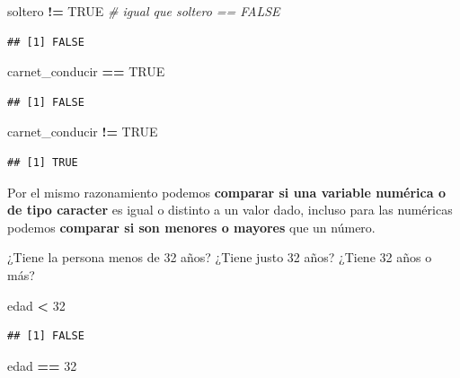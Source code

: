 \documentclass[11pt,]{book}
\newenvironment{Shaded}{\begin{snugshade}}{\end{snugshade}}
\newcommand{\CommentTok}[1]{\textcolor[rgb]{0.37,0.37,0.37}{\textit{#1}}}
\newcommand{\DecValTok}[1]{\textcolor[rgb]{0.06,0.06,0.06}{#1}}
\newcommand{\NormalTok}[1]{#1}
\newcommand{\OperatorTok}[1]{\textcolor[rgb]{0.43,0.43,0.43}{\textbf{#1}}}
\newcommand{\OtherTok}[1]{\textcolor[rgb]{0.37,0.37,0.37}{#1}}
\newcommand{\StringTok}[1]{\textcolor[rgb]{0.5,0.5,0.5}{#1}}
\begin{document}
\begin{Shaded}
\begin{Highlighting}[]
\NormalTok{soltero }\OperatorTok{!=}\StringTok{ }\OtherTok{TRUE} \CommentTok{# igual que soltero == FALSE}
\end{Highlighting}
\end{Shaded}

\begin{verbatim}
## [1] FALSE
\end{verbatim}

\begin{Shaded}
\begin{Highlighting}[]
\NormalTok{carnet_conducir }\OperatorTok{==}\StringTok{ }\OtherTok{TRUE}
\end{Highlighting}
\end{Shaded}

\begin{verbatim}
## [1] FALSE
\end{verbatim}

\begin{Shaded}
\begin{Highlighting}[]
\NormalTok{carnet_conducir }\OperatorTok{!=}\StringTok{ }\OtherTok{TRUE}
\end{Highlighting}
\end{Shaded}

\begin{verbatim}
## [1] TRUE
\end{verbatim}

Por el mismo razonamiento podemos \textbf{comparar si una variable numérica o de tipo caracter} es igual o distinto a un valor dado, incluso para las numéricas podemos \textbf{comparar si son menores o mayores} que un número.

¿Tiene la persona menos de 32 años? ¿Tiene justo 32 años? ¿Tiene 32 años o más?

\begin{Shaded}
\begin{Highlighting}[]
\NormalTok{edad }\OperatorTok{<}\StringTok{ }\DecValTok{32}
\end{Highlighting}
\end{Shaded}

\begin{verbatim}
## [1] FALSE
\end{verbatim}

\begin{Shaded}
\begin{Highlighting}[]
\NormalTok{edad }\OperatorTok{==}\StringTok{ }\DecValTok{32}
\end{Highlighting}
\end{Shaded}
\end{document}
